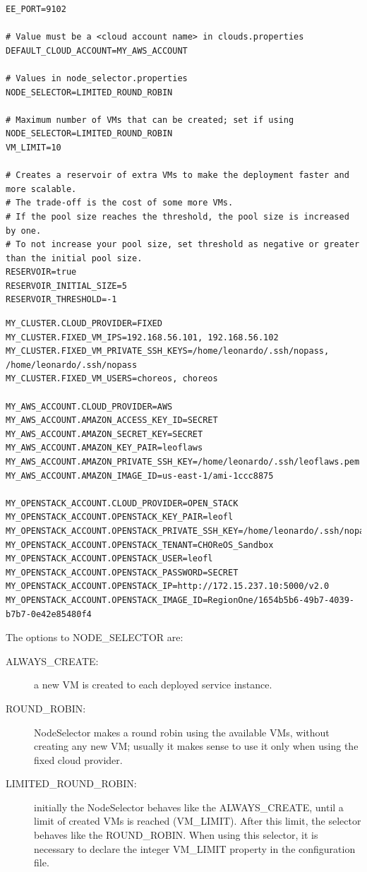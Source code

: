 {\footnotesize
\begin{lstlisting}[caption=ee.properties example.,label=lst:deployment_properties] 
EE_PORT=9102

# Value must be a <cloud account name> in clouds.properties
DEFAULT_CLOUD_ACCOUNT=MY_AWS_ACCOUNT

# Values in node_selector.properties
NODE_SELECTOR=LIMITED_ROUND_ROBIN

# Maximum number of VMs that can be created; set if using NODE_SELECTOR=LIMITED_ROUND_ROBIN
VM_LIMIT=10

# Creates a reservoir of extra VMs to make the deployment faster and more scalable.
# The trade-off is the cost of some more VMs.
# If the pool size reaches the threshold, the pool size is increased by one.
# To not increase your pool size, set threshold as negative or greater than the initial pool size.
RESERVOIR=true
RESERVOIR_INITIAL_SIZE=5
RESERVOIR_THRESHOLD=-1
\end{lstlisting}

\begin{lstlisting}[caption=cloud.properties example.,label=lst:deployment_properties] 
MY_CLUSTER.CLOUD_PROVIDER=FIXED
MY_CLUSTER.FIXED_VM_IPS=192.168.56.101, 192.168.56.102
MY_CLUSTER.FIXED_VM_PRIVATE_SSH_KEYS=/home/leonardo/.ssh/nopass, /home/leonardo/.ssh/nopass
MY_CLUSTER.FIXED_VM_USERS=choreos, choreos

MY_AWS_ACCOUNT.CLOUD_PROVIDER=AWS
MY_AWS_ACCOUNT.AMAZON_ACCESS_KEY_ID=SECRET
MY_AWS_ACCOUNT.AMAZON_SECRET_KEY=SECRET
MY_AWS_ACCOUNT.AMAZON_KEY_PAIR=leoflaws
MY_AWS_ACCOUNT.AMAZON_PRIVATE_SSH_KEY=/home/leonardo/.ssh/leoflaws.pem
MY_AWS_ACCOUNT.AMAZON_IMAGE_ID=us-east-1/ami-1ccc8875

MY_OPENSTACK_ACCOUNT.CLOUD_PROVIDER=OPEN_STACK
MY_OPENSTACK_ACCOUNT.OPENSTACK_KEY_PAIR=leofl
MY_OPENSTACK_ACCOUNT.OPENSTACK_PRIVATE_SSH_KEY=/home/leonardo/.ssh/nopass
MY_OPENSTACK_ACCOUNT.OPENSTACK_TENANT=CHOReOS_Sandbox
MY_OPENSTACK_ACCOUNT.OPENSTACK_USER=leofl
MY_OPENSTACK_ACCOUNT.OPENSTACK_PASSWORD=SECRET
MY_OPENSTACK_ACCOUNT.OPENSTACK_IP=http://172.15.237.10:5000/v2.0
MY_OPENSTACK_ACCOUNT.OPENSTACK_IMAGE_ID=RegionOne/1654b5b6-49b7-4039-b7b7-0e42e85480f4
\end{lstlisting}
}

The options to NODE\_SELECTOR are: 

\begin{description}
\item [ALWAYS\_CREATE:] a new VM is created to each deployed service instance.
\item [ROUND\_ROBIN:] \textsf{NodeSelector} makes a round robin using the available VMs, without creating any new VM; usually it makes sense to use it only when using the fixed cloud provider.
\item [LIMITED\_ROUND\_ROBIN:] initially the \textsf{NodeSelector} behaves like the ALWAYS\_CREATE, until a limit of created VMs is reached (VM\_LIMIT). After this limit, the selector behaves like the ROUND\_ROBIN. When using this selector, it is necessary to declare the integer VM\_LIMIT property in the configuration file.
\end{description}

